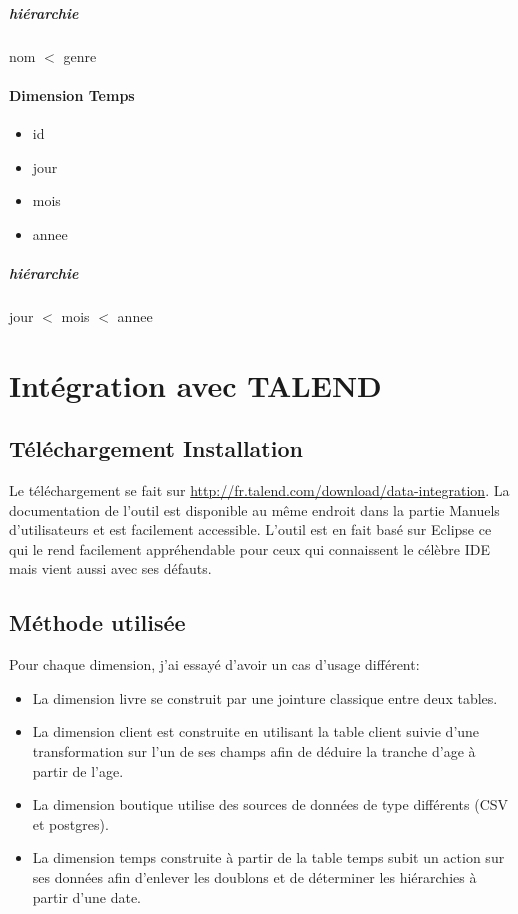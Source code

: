 \subparagraph{hiérarchie}
nom $<$ genre

\paragraph{Dimension Temps}

\begin{itemize}
\item id
\item jour
\item mois
\item annee
\end{itemize}

\subparagraph{hiérarchie}
jour $<$ mois $<$ annee

\section{Intégration avec TALEND}

\subsection{Téléchargement Installation}
Le téléchargement se fait sur \url{http://fr.talend.com/download/data-integration}.
La documentation de l'outil est disponible au même endroit dans la partie Manuels d'utilisateurs et est facilement accessible.
L'outil est en fait basé sur Eclipse ce qui le rend facilement appréhendable pour ceux qui connaissent le célèbre IDE mais vient aussi avec ses défauts.

\subsection{Méthode utilisée}

Pour chaque dimension, j'ai essayé d'avoir un cas d'usage différent:
\begin{itemize}
\item La dimension livre se construit par une jointure classique entre deux tables. 
\item La dimension client est construite en utilisant la table client suivie d'une transformation sur l'un de ses champs afin de déduire la tranche d'age à partir de l'age.
\item La dimension boutique utilise des sources de données de type différents (CSV et postgres).
\item La dimension temps construite à partir de la table temps subit un action sur ses données afin d'enlever les doublons et de déterminer les hiérarchies à partir d'une date.
\end{itemize}

